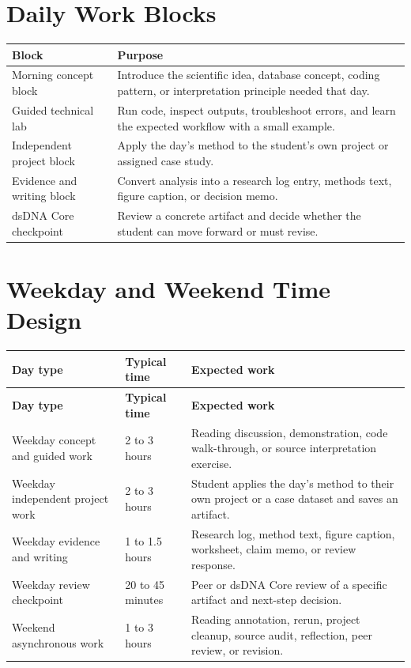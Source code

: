\section{Daily Work Blocks}
\begin{tabularx}{\textwidth}{p{}Y}
\toprule
\textbf{Block} & \textbf{Purpose}\\
\midrule
Morning concept block & Introduce the scientific idea, database concept, coding pattern, or interpretation principle needed that day.\\
Guided technical lab & Run code, inspect outputs, troubleshoot errors, and learn the expected workflow with a small example.\\
Independent project block & Apply the day's method to the student's own project or assigned case study.\\
Evidence and writing block & Convert analysis into a research log entry, methods text, figure caption, or decision memo.\\
dsDNA Core checkpoint & Review a concrete artifact and decide whether the student can move forward or must revise.\\
\bottomrule
\end{tabularx}

\section{Weekday and Weekend Time Design}
\begin{longtable}{p{}p{}p{}}
\toprule
\textbf{Day type} & \textbf{Typical time} & \textbf{Expected work}\\
\midrule
\endfirsthead
\toprule
\textbf{Day type} & \textbf{Typical time} & \textbf{Expected work}\\
\midrule
\endhead
Weekday concept and guided work & 2 to 3 hours & Reading discussion, demonstration, code walk-through, or source interpretation exercise.\\
Weekday independent project work & 2 to 3 hours & Student applies the day's method to their own project or a case dataset and saves an artifact.\\
Weekday evidence and writing & 1 to 1.5 hours & Research log, method text, figure caption, worksheet, claim memo, or review response.\\
Weekday review checkpoint & 20 to 45 minutes & Peer or dsDNA Core review of a specific artifact and next-step decision.\\
Weekend asynchronous work & 1 to 3 hours & Reading annotation, rerun, project cleanup, source audit, reflection, peer review, or revision.\\
\bottomrule
\end{longtable}


